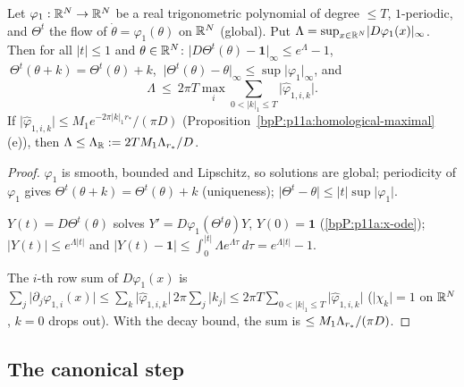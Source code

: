 \begin{lemma}\label{bpP:p11a:real-lipschitz}
Let $\varphi_1:\mathbb{R}^N\to\mathbb{R}^N$ be a real trigonometric polynomial of degree $\le T$, $1$-periodic, and $\Theta^t$ the flow of $\dot\theta=\varphi_1(\theta)$ on $\mathbb{R}^N$ (global). Put $\Lambda=\sup_{x\in\mathbb{R}^N}\lvert D\varphi_1(x)\rvert_\infty$. Then for all $\lvert t\rvert\le1$ and $\theta\in\mathbb{R}^N$:
$\lvert D\Theta^t(\theta)-\mathbf 1\rvert_\infty\le e^{\Lambda}-1$, $\ \Theta^t(\theta+k)=\Theta^t(\theta)+k$, $\ \lvert\Theta^t(\theta)-\theta\rvert_\infty\le\sup\lvert\varphi_1\rvert_\infty$, and
\[\Lambda\ \le\ 2\pi T\max_i\sum_{0<\lvert k\rvert_1\le T}\lvert\hat\varphi_{1,i,k}\rvert .\]
If $\lvert\hat\varphi_{1,i,k}\rvert\le M_1e^{-2\pi\lvert k\rvert_1r_*}/(\pi D)$ (Proposition~\ref{bpP:p11a:homological-maximal}(e)), then $\Lambda\le\Lambda_\mathbb R:=2TM_1\Lambda_{r_*}/D$.
\end{lemma}
\begin{proof}
\label{stepP:p11a:rl-global} $\varphi_1$ is smooth, bounded and Lipschitz, so solutions are global; periodicity of $\varphi_1$ gives $\Theta^t(\theta+k)=\Theta^t(\theta)+k$ (uniqueness); $\lvert\Theta^t-\theta\rvert\le\lvert t\rvert\sup\lvert\varphi_1\rvert$.

\label{stepP:p11a:rl-deriv} $Y(t)=D\Theta^t(\theta)$ solves $Y'=D\varphi_1(\Theta^t\theta)Y$, $Y(0)=\mathbf 1$ (\ref{bpP:p11a:x-ode}); $\lvert Y(t)\rvert\le e^{\Lambda\lvert t\rvert}$ and $\lvert Y(t)-\mathbf 1\rvert\le\int_0^{\lvert t\rvert}\Lambda e^{\Lambda\tau}\,d\tau=e^{\Lambda\lvert t\rvert}-1$.

\label{stepP:p11a:rl-const} The $i$-th row sum of $D\varphi_1(x)$ is $\sum_j\lvert\partial_j\varphi_{1,i}(x)\rvert\le\sum_{k}\lvert\hat\varphi_{1,i,k}\rvert\,2\pi\sum_j\lvert k_j\rvert\le2\pi T\sum_{0<\lvert k\rvert_1\le T}\lvert\hat\varphi_{1,i,k}\rvert$ ($\lvert\chi_k\rvert=1$ on $\mathbb{R}^N$, $k=0$ drops out). With the decay bound, the sum is $\le M_1\Lambda_{r_*}/(\pi D)$.
\end{proof}

\subsection{The canonical step}\label{bpP:p11a:sec-step}

